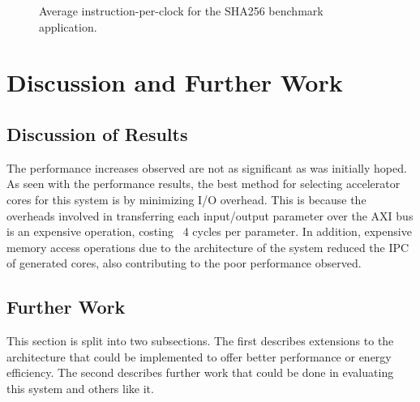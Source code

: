 \documentclass{UoYCSproject}
\begin{document}
\begin{figure}[H]
\caption{Average instruction-per-clock for the SHA256 benchmark application.}
\label{fig:ipcSHA256}
\end{figure}

\chapter{Discussion and Further Work}

\section{Discussion of Results}

The performance increases observed are not as significant as was initially hoped.
As seen with the performance results, the best method for selecting accelerator cores for this system is by minimizing
I/O overhead. This is because the overheads involved in transferring each input/output parameter over the AXI bus is an
expensive operation, costing ~4 cycles per parameter. In addition, expensive memory access operations
due to the architecture of the system reduced the IPC of generated cores, also contributing to
the poor performance observed.

\section{Further Work}

This section is split into two subsections. The first describes extensions to the architecture that could be implemented
to offer better performance or energy efficiency. The second describes further work that could be done in evaluating this
system and others like it.
\end{document}

